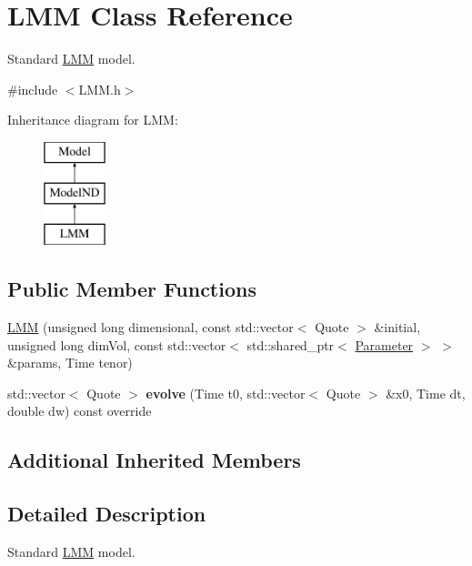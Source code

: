 \hypertarget{class_l_m_m}{}\section{L\+MM Class Reference}
\label{class_l_m_m}


Standard \hyperlink{class_l_m_m}{L\+MM} model.  




{\ttfamily \#include $<$L\+M\+M.\+h$>$}

Inheritance diagram for L\+MM\+:\begin{figure}[H]
\begin{center}
\leavevmode
\includegraphics[height=3.000000cm]{class_l_m_m}
\end{center}
\end{figure}
\subsection*{Public Member Functions}
\begin{DoxyCompactItemize}
\item 
\hyperlink{class_l_m_m_aabe5f5723727412de2e34c4d1bf4f3b8}{L\+MM} (unsigned long dimensional, const std\+::vector$<$ Quote $>$ \&initial, unsigned long dim\+Vol, const std\+::vector$<$ std\+::shared\+\_\+ptr$<$ \hyperlink{class_parameter}{Parameter} $>$ $>$ \&params, Time tenor)
\item 
\hypertarget{class_l_m_m_a8dfdd340048e482a8059f473b5aacfd1}{}\label{class_l_m_m_a8dfdd340048e482a8059f473b5aacfd1} 
std\+::vector$<$ Quote $>$ {\bfseries evolve} (Time t0, std\+::vector$<$ Quote $>$ \&x0, Time dt, double dw) const override
\end{DoxyCompactItemize}
\subsection*{Additional Inherited Members}


\subsection{Detailed Description}
Standard \hyperlink{class_l_m_m}{L\+MM} model. 

